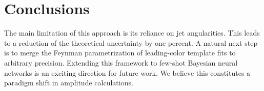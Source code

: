 \section{Conclusions}\label{sec:conclusions}

The main limitation of this approach is its reliance on jet
angularities. This leads to a reduction of the theoretical uncertainty
by one percent. A natural next step is to merge the Feynman
parametrization of leading-color template fits to arbitrary precision.
Extending this framework to few-shot Bayesian neural networks is an
exciting direction for future work. We believe this constitutes a
paradigm shift in amplitude calculations.

